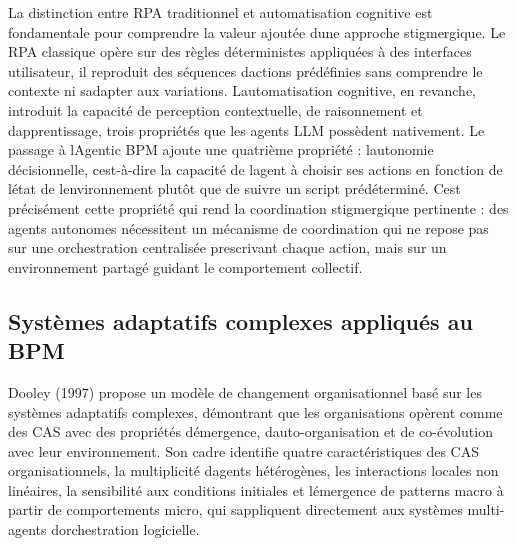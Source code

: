 \documentclass[12pt,a4paper]{article}
\begin{document}
La distinction entre RPA traditionnel et automatisation cognitive est
fondamentale pour comprendre la valeur ajoutée d\textquotesingle une
approche stigmergique. Le RPA classique opère sur des règles
déterministes appliquées à des interfaces utilisateur, il reproduit
des séquences d\textquotesingle actions prédéfinies sans comprendre le
contexte ni s\textquotesingle adapter aux variations.
L\textquotesingle automatisation cognitive, en revanche, introduit la
capacité de perception contextuelle, de raisonnement et
d\textquotesingle apprentissage, trois propriétés que les agents LLM
possèdent nativement. Le passage à l\textquotesingle Agentic BPM ajoute
une quatrième propriété : l\textquotesingle autonomie décisionnelle,
c\textquotesingle est-à-dire la capacité de l\textquotesingle agent à
choisir ses actions en fonction de l\textquotesingle état de
l\textquotesingle environnement plutôt que de suivre un script
prédéterminé. C\textquotesingle est précisément cette propriété qui rend
la coordination stigmergique pertinente : des agents autonomes
nécessitent un mécanisme de coordination qui ne repose pas sur une
orchestration centralisée prescrivant chaque action, mais sur un
environnement partagé guidant le comportement collectif.

\subsection{Systèmes adaptatifs complexes appliqués au
BPM}\label{systuxe8mes-adaptatifs-complexes-appliquuxe9s-au-bpm}

Dooley (1997) propose un modèle de changement organisationnel basé sur
les systèmes adaptatifs complexes, démontrant que les organisations
opèrent comme des CAS avec des propriétés d\textquotesingle émergence,
d\textquotesingle auto-organisation et de co-évolution avec leur
environnement. Son cadre identifie quatre caractéristiques des CAS
organisationnels, la multiplicité d\textquotesingle agents
hétérogènes, les interactions locales non linéaires, la sensibilité aux
conditions initiales et l\textquotesingle émergence de patterns macro à
partir de comportements micro, qui s\textquotesingle appliquent
directement aux systèmes multi-agents d\textquotesingle orchestration
logicielle.
\end{document}

